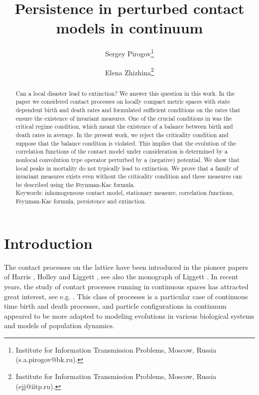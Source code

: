 \documentclass[a4paper,12pt]{article}
\begin{document}
\title{Persistence in perturbed contact models in continuum}


\author{Sergey Pirogov\thanks{
Institute for Information Transmission Problems, Moscow, Russia
(s.a.pirogov@bk.ru).} \and Elena Zhizhina\thanks{Institute for
Information Transmission Problems, Moscow, Russia (ejj@iitp.ru).} }

\date{}

\maketitle

\begin{abstract}
Can a local disaster lead to extinction? We answer this question in this work.
In the paper \cite{PZ-PPI} we considered contact processes on locally compact metric spaces with state dependent birth and death rates and formulated sufficient conditions on the rates that ensure the existence of invariant measures. One of the crucial conditions in \cite{PZ-PPI} was the critical regime condition, which meant the existence of a balance between birth and death rates in average. In the present work, we reject the criticality condition and suppose that the balance condition is violated. This implies that the evolution of the correlation functions of the contact model under consideration is determined by a nonlocal convolution type operator perturbed by a (negative) potential. We show that local peaks in mortality do not typically lead to extinction. We prove that a family of invariant measures exists even without the criticality condition and these measures can be described using the Feynman-Kac formula.
\\

Keywords: inhomogeneous contact model, stationary measure, correlation functions, Feynman-Kac formula, persistence and extinction.
\end{abstract}


\section{Introduction}


The contact processes on the lattice have been introduced in the pioneer papers of Harris \cite{H}, Holley and Liggett \cite{HL}, see also the monograph of Liggett \cite{Lig1985}.
In recent years, the study of contact processes running in continuous spaces has attracted great interest,
see e.g. \cite{KKP, KKPZ, KS}. This class of processes is a particular case of continuous time birth and death processes, and particle configurations in continuum appeared to be more adapted to modeling evolutions in various biological systems and models of population dynamics.
\end{document}
